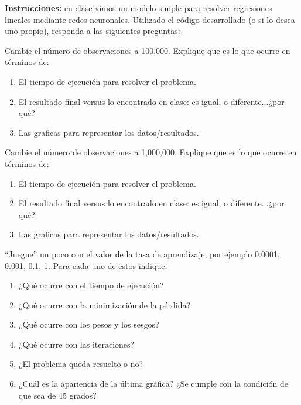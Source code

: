 





\textbf{Instrucciones:} en clase vimos un modelo simple para resolver regresiones lineales mediante redes neuronales.  Utilizado el código desarrollado (o si lo desea uno propio), responda a las siguientes preguntas:


\begin{problema}
	Cambie el número de observaciones a 100,000.  Explique que es lo que ocurre en términos de:
	\begin{enumerate}
		\item El tiempo de ejecución para resolver el problema.
		\item El resultado final versus lo encontrado en clase:  es igual, o diferente...¿por qué?
		\item Las graficas  para representar los datos/resultados.
	\end{enumerate}
\end{problema}

\begin{problema}
	Cambie el número de observaciones a 1,000,000.  Explique que es lo que ocurre en términos de:
	\begin{enumerate}
		\item El tiempo de ejecución para resolver el problema.
		\item El resultado final versus lo encontrado en clase:  es igual, o diferente...¿por qué?
		\item Las graficas  para representar los datos/resultados.
	\end{enumerate}

\end{problema}

\begin{problema}
	“Juegue” un poco con el valor de la tasa de aprendizaje, por ejemplo  0.0001, 0.001, 0.1, 1.  Para cada uno de estos indique:
	\begin{enumerate}
		\item ¿Qué ocurre con el tiempo de ejecución?
		\item ¿Qué ocurre con la minimización de la pérdida?
		\item ¿Qué ocurre con los pesos y los sesgos?
		\item ¿Qué ocurre con las iteraciones?
		\item ¿El problema queda resuelto o no?  
		\item ¿Cuál es la apariencia de la última gráfica?  ¿Se cumple con la condición de que sea de 45 grados?
	\end{enumerate}
	
\end{problema}


